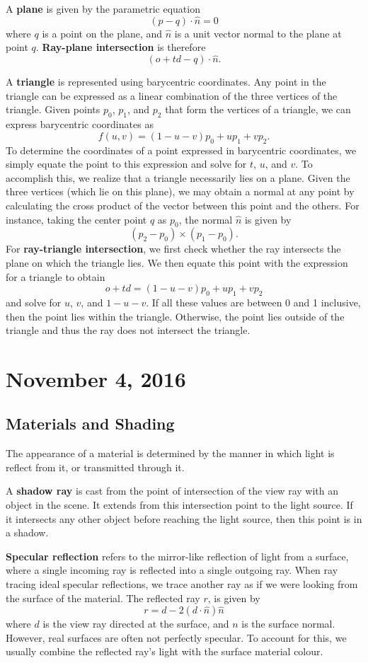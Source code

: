 \documentclass[11pt]{article}
\theoremstyle{plain} %
\theoremstyle{definition}
\theoremstyle{example}
\theoremstyle{remark}
\begin{document}
A \textbf{plane} is given by the parametric equation
$$(p-q) \cdot \hat{n} = 0$$
where $q$ is a point on the plane, and $\hat{n}$ is a unit vector normal to the plane at point $q$. \textbf{Ray-plane intersection} is therefore
$$(o + td - q) \cdot \hat{n}.$$

A \textbf{triangle} is represented using barycentric coordinates. Any point in the triangle can be expressed as a linear combination of the three vertices of the triangle. Given points $p_0$, $p_1$, and $p_2$ that form the vertices of a triangle, we can express barycentric coordinates as 
$$f(u,v) = (1-u-v)p_0 + up_1 + vp_2.$$
To determine the coordinates of a point expressed in barycentric coordinates, we simply equate the point to this expression and solve for $t$, $u$, and $v$. To accomplish this, we realize that a triangle necessarily lies on a plane. Given the three vertices (which lie on this plane), we may obtain a normal at any point by calculating the cross product of the vector between this point and the others. For instance, taking the center point $q$ as $p_0$, the normal $\hat{n}$ is given by $$(p_2 - p_0) \times (p_1 - p_0).$$ For \textbf{ray-triangle intersection}, we first check whether the ray intersects the plane on which the triangle lies. We then equate this point with the expression for a triangle to obtain 
$$o + td = (1 - u- v)p_0 + up_1 + vp_2$$ 
and solve for $u$, $v$, and $1-u-v$. If all these values are between 0 and 1 inclusive, then the point lies within the triangle. Otherwise, the point lies outside of the triangle and thus the ray does not intersect the triangle. 
	
\section{November 4, 2016}
\subsection{Materials and Shading}

The appearance of a material is determined by the manner in which light is reflect from it, or transmitted through it. 

A \textbf{shadow ray} is cast from the point of intersection of the view ray with an object in the scene. It extends from this intersection point to the light source. If it intersects any other object before reaching the light source, then this point is in a shadow.

\textbf{Specular reflection} refers to the mirror-like reflection of light from a surface, where a single incoming ray is reflected into a single outgoing ray. When ray tracing ideal specular reflections, we trace another ray as if we were looking from the surface of the material. The reflected ray $r$, is given by 
$$r = d-2\left(d \cdot \hat{n}\right)\hat{n}$$
where $d$ is the view ray directed at the surface, and $n$ is the surface normal. However, real surfaces are often not perfectly specular. To account for this, we usually combine the reflected ray's light with the surface material colour. 
\end{document}
